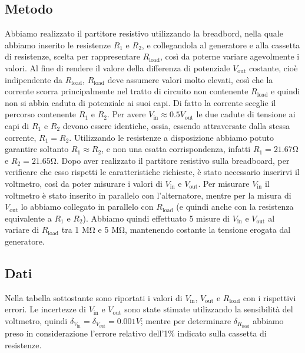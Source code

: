 \documentclass[a4paper]{article}
\begin{document}
\subsection{Metodo}
Abbiamo realizzato il partitore resistivo utilizzando la breadbord, nella quale abbiamo inserito le resistenze $R_1$ e $R_2$,
e collegandola al generatore e alla cassetta di resistenze, scelta per rappresentare $R_{\text{load}}$, così da poterne variare agevolmente i valori.
Al fine di rendere il valore della differenza di potenziale $V_{\text{out}}$ costante, cioè indipendente da $R_{\text{load}}$,
$R_{\text{load}}$ deve assumere valori molto elevati, così che la corrente scorra principalmente nel tratto di circuito non contenente $R_{\text{load}}$
e quindi non si abbia caduta di potenziale ai suoi capi.
Di fatto la corrente sceglie il percorso contenente $R_1$ e $R_2$.
Per avere $V_{\text{in}} \approx 0.5V_{\text{out}}$ le due cadute di tensione ai capi di $R_1$ e $R_2$ devono essere identiche, ossia, essendo attraversate dalla stessa corrente, $R_1=R_2$.
Utilizzando le resistenze a disposizione abbiamo potuto garantire soltanto $R_1\approx R_2$, e non una esatta corrispondenza, infatti $R_1=21.67 \si{\ohm}$ e $R_2=21.65 \si{\ohm}$.
Dopo aver realizzato il partitore resistivo sulla breadboard, per verificare che esso rispetti le caratteristiche richieste, è stato necessario inserirvi il voltmetro,
così da poter misurare i valori di $V_{\text{in}}$ e $V_{\text{out}}$. Per misurare $V_{\text{in}}$ il voltmetro è stato inserito in parallelo con l'alternatore,
mentre per la misura di $V_{\text{out}}$ lo abbiamo collegato in parallelo con $R_{\text{load}}$ (e quindi anche con la resistenza equivalente a $R_1$ e $R_2$).
Abbiamo quindi effettuato 5 misure di $V_{\text{in}}$ e $V_{\text{out}}$ al variare di $R_{\text{load}}$ tra 1 \si{\mega\ohm} e 5 \si{\mega\ohm},  mantenendo costante la tensione erogata dal generatore.
\subsection{Dati}
Nella tabella sottostante sono riportati i valori di $V_{\text{in}}$, $V_{\text{out}}$ e $R_{\text{load}}$ con i rispettivi errori.
Le incertezze di $V_{\text{in}}$ e $V_{\text{out}}$ sono state stimate utilizzando la sensibilità del voltmetro, quindi $\delta_{V_{\text{in}}}=\delta_{V_{\text{out}}}=0.001 V$;
mentre per determinare $\delta_{R_{\text{load}}}$ abbiamo preso in considerazione l'errore relativo dell'1\% indicato sulla cassetta di resistenze.
\end{document}
